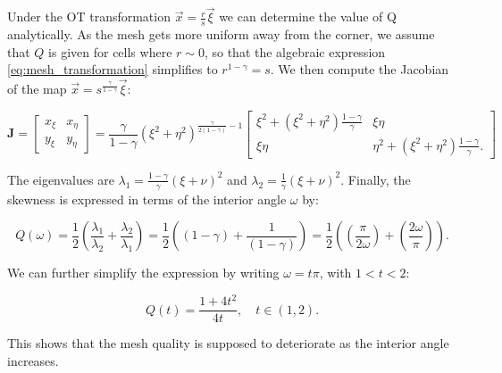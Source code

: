 \documentclass[a4paper,11pt]{article}
\begin{document}
Under the OT transformation $\vec x = \frac{r}{s} \vec \xi$ we can determine the value of Q analytically. As the mesh gets more uniform away from the corner, we assume that $Q$ is given for cells where $r \sim 0$, so that the algebraic expression \eqref{eq:mesh_transformation} simplifies to $r^{1-\gamma} = s$. We then compute the Jacobian of the map $\vec x = s^{\frac{\gamma}{1-\gamma}} \vec \xi $:


\begin{equation*} 
 \pmb{J} =  \begin{bmatrix}
x_{\xi} & x_{\eta} \\
y_{\xi} & y_{\eta}  
\end{bmatrix} =  
\frac{\gamma}{1-\gamma} (\xi^{2} + \eta^{2})^{\frac{\gamma}{2(1-\gamma)}-1} \begin{bmatrix}
 \xi^{2} + (\xi^{2} + \eta^{2})\frac{1-\gamma}{\gamma} &  \xi \eta  \\
 \xi \eta &  \eta^{2} + (\xi^{2} + \eta^{2})\frac{1-\gamma}{\gamma}.    
\end{bmatrix}
\end{equation*}

The eigenvalues are $\lambda_{1} = \frac{1-\gamma}{\gamma}(\xi + \nu)^{2}$ and $\lambda_{2} = \frac{1}{\gamma}(\xi + \nu)^{2}$. Finally, the skewness is expressed in terms of the interior angle $\omega$ by:

\begin{equation}
 Q(\omega) = \frac{1}{2}\left(\frac{\lambda_{1}}{\lambda_{2}} + \frac{\lambda_{2}}{\lambda_{1}}\right) =  \frac{1}{2}\left((1-\gamma) + \frac{1}{(1-\gamma)}\right) =  \frac{1}{2}\left(\left(\frac{\pi}{2\omega}\right) + \left(\frac{2\omega}{\pi}\right)\right).
\end{equation}

We can further simplify the expression by writing $\omega = t\pi$, with $1 < t < 2$:

\begin{equation}
 Q(t) = \frac{1 + 4t^{2}}{4t}, \quad t \in (1,2).
\end{equation}

This shows that the mesh quality is supposed to deteriorate as the interior angle increases.
\end{document}
